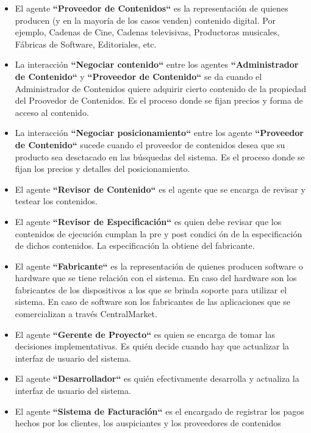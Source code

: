 \documentclass[11pt, a4paper, spanish]{article}
\begin{document}
\begin{itemize}
	\item El agente \textbf{``Proveedor de Contenidos``} es la representaci\'on de quienes producen (y en la mayor\'ia de los casos venden) 
	contenido digital. Por ejemplo, Cadenas de Cine, Cadenas televisivas, Productoras musicales, F\'abricas de Software, Editoriales, etc. 

	\item La interacci\'on \textbf{``Negociar contenido``} entre los agentes \textbf{``Administrador de Contenido``} y \textbf{``Proveedor de 
	Contenido``} se da cuando el Administrador de Contenidos quiere adquirir cierto contenido de la propiedad del Proovedor de Contenidos. Es el 
	proceso donde se fijan precios y forma de acceso al contenido.
	   
	\item La interacci\'on \textbf{``Negociar posicionamiento``} entre los agente \textbf{``Proveedor de Contenido``} sucede cuando el proveedor de 
	contenidos desea que su producto sea desctacado en las b\'usquedas del sistema. Es el proceso donde se fijan los precios y detalles del 
	posicionamiento.

	\item El agente \textbf{``Revisor de Contenido``} es el agente que se encarga de revisar y testear los contenidos.

	\item El agente \textbf{``Revisor de Especificaci\'on``} es quien debe revisar que los contenidos de ejecuci\'on cumplan la pre y post condici
	\'on de la especificaci\'on de dichos contenidos.
	La especificaci\'on la obtiene del fabricante.

	\item El agente \textbf{``Fabricante``} es la representaci\'on de quienes producen software o hardware que se tiene relaci\'on con el sistema. 
	En caso del hardware son los fabricantes de los dispositivos a los que se brinda soporte para utilizar el sistema. En caso de software son los 
	fabricantes de las aplicaciones que se comercializan a trav\'es CentralMarket.

	\item El agente \textbf{``Gerente de Proyecto``} es quien se encarga de tomar las decisiones implementativas. Es qui\'en decide cuando hay que 
	actualizar la interfaz de usuario del sistema.

	\item El agente \textbf{``Desarrollador``} es qui\'en efectivamente desarrolla y actualiza la interfaz de usuario del sistema.

	\item El agente \textbf{``Sistema de Facturaci\'on``} es el encargado de registrar los pagos hechos por los clientes, los auspiciantes y los 
	proveedores de contenidos


\end{itemize}
\end{document}
